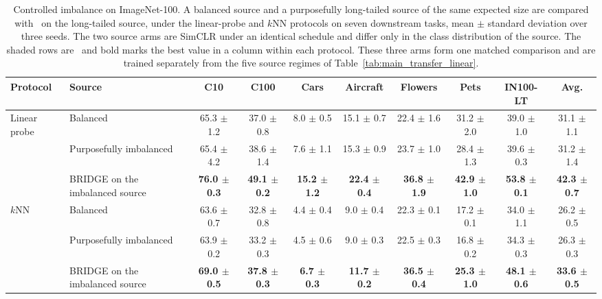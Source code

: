 \begin{table}[t]
\centering
\tiny
\setlength{\tabcolsep}{2.6pt}
\renewcommand{\arraystretch}{0.9}
\caption{Controlled imbalance on ImageNet-100. A balanced source and a purposefully long-tailed source of the same expected size are compared with \method\ on the long-tailed source, under the linear-probe and $k$NN protocols on seven downstream tasks, mean $\pm$ standard deviation over three seeds. The two source arms are SimCLR under an identical schedule and differ only in the class distribution of the source. The shaded rows are \method\ and bold marks the best value in a column within each protocol. These three arms form one matched comparison and are trained separately from the five source regimes of Table~\ref{tab:main_transfer_linear}.}
\label{tab:main_controlled_imbalance}
\begin{adjustbox}{max width=\textwidth}
\begin{tabular}{l l c c c c c c c c}
\toprule
Protocol & Source & C10 & C100 & Cars & Aircraft & Flowers & Pets & IN100-LT & Avg. \\
\midrule
Linear probe & Balanced & 65.3 {\scriptsize$\pm$ 1.2} & 37.0 {\scriptsize$\pm$ 0.8} & 8.0 {\scriptsize$\pm$ 0.5} & 15.1 {\scriptsize$\pm$ 0.7} & 22.4 {\scriptsize$\pm$ 1.6} & 31.2 {\scriptsize$\pm$ 2.0} & 39.0 {\scriptsize$\pm$ 1.0} & 31.1 {\scriptsize$\pm$ 1.1} \\
 & Purposefully imbalanced & 65.4 {\scriptsize$\pm$ 4.2} & 38.6 {\scriptsize$\pm$ 1.4} & 7.6 {\scriptsize$\pm$ 1.1} & 15.3 {\scriptsize$\pm$ 0.9} & 23.7 {\scriptsize$\pm$ 1.0} & 28.4 {\scriptsize$\pm$ 1.3} & 39.6 {\scriptsize$\pm$ 0.3} & 31.2 {\scriptsize$\pm$ 1.4} \\
\rowcolor{blue!10} & BRIDGE on the imbalanced source & \textbf{76.0 {\scriptsize$\pm$ 0.3}} & \textbf{49.1 {\scriptsize$\pm$ 0.2}} & \textbf{15.2 {\scriptsize$\pm$ 1.2}} & \textbf{22.4 {\scriptsize$\pm$ 0.4}} & \textbf{36.8 {\scriptsize$\pm$ 1.9}} & \textbf{42.9 {\scriptsize$\pm$ 1.0}} & \textbf{53.8 {\scriptsize$\pm$ 0.1}} & \textbf{42.3 {\scriptsize$\pm$ 0.7}} \\
\midrule
$k$NN & Balanced & 63.6 {\scriptsize$\pm$ 0.7} & 32.8 {\scriptsize$\pm$ 0.8} & 4.4 {\scriptsize$\pm$ 0.4} & 9.0 {\scriptsize$\pm$ 0.4} & 22.3 {\scriptsize$\pm$ 0.1} & 17.2 {\scriptsize$\pm$ 0.1} & 34.0 {\scriptsize$\pm$ 1.1} & 26.2 {\scriptsize$\pm$ 0.5} \\
 & Purposefully imbalanced & 63.9 {\scriptsize$\pm$ 0.2} & 33.2 {\scriptsize$\pm$ 0.3} & 4.5 {\scriptsize$\pm$ 0.6} & 9.0 {\scriptsize$\pm$ 0.3} & 22.5 {\scriptsize$\pm$ 0.3} & 16.8 {\scriptsize$\pm$ 0.2} & 34.3 {\scriptsize$\pm$ 0.3} & 26.3 {\scriptsize$\pm$ 0.3} \\
\rowcolor{blue!10} & BRIDGE on the imbalanced source & \textbf{69.0 {\scriptsize$\pm$ 0.5}} & \textbf{37.8 {\scriptsize$\pm$ 0.3}} & \textbf{6.7 {\scriptsize$\pm$ 0.3}} & \textbf{11.7 {\scriptsize$\pm$ 0.2}} & \textbf{36.5 {\scriptsize$\pm$ 0.4}} & \textbf{25.3 {\scriptsize$\pm$ 1.0}} & \textbf{48.1 {\scriptsize$\pm$ 0.6}} & \textbf{33.6 {\scriptsize$\pm$ 0.5}} \\
\bottomrule
\end{tabular}
\end{adjustbox}
\end{table}

